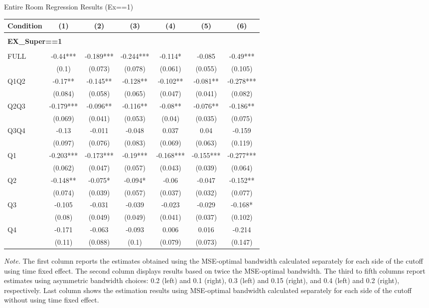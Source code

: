 \begin{table}[]
\TABLE
{Entire Room Regression Results (Ex==1) \label{result_detail1}}{\begin{tabular}{lcccccc}
\hline
Condition & (1) & (2) & (3) & (4) & (5) & (6) \\ \hline
\\ 
\multicolumn{5}{l}{\textbf{EX\_Super==1}} \\ 
\\ 
FULL & -0.44*** & -0.189*** & -0.244*** & -0.114* & -0.085 & -0.49*** \\ 
&(0.1)&(0.073) & (0.078)&(0.061)&(0.055)&(0.105)\\ 
Q1Q2 & -0.17** & -0.145** & -0.128** & -0.102** & -0.081** & -0.278*** \\ 
&(0.084)&(0.058) & (0.065)&(0.047)&(0.041)&(0.082)\\ 
Q2Q3 & -0.179*** & -0.096** & -0.116** & -0.08** & -0.076** & -0.186** \\ 
&(0.069)&(0.041) & (0.053)&(0.04)&(0.035)&(0.075)\\ 
Q3Q4 & -0.13 & -0.011 & -0.048 & 0.037 & 0.04 & -0.159 \\ 
&(0.097)&(0.076) & (0.083)&(0.069)&(0.063)&(0.119)\\ 
Q1 & -0.203*** & -0.173*** & -0.19*** & -0.168*** & -0.155*** & -0.277*** \\ 
&(0.062)&(0.047) & (0.057)&(0.043)&(0.039)&(0.064)\\ 
Q2 & -0.148** & -0.075* & -0.094* & -0.06 & -0.047 & -0.152** \\ 
&(0.074)&(0.039) & (0.057)&(0.037)&(0.032)&(0.077)\\ 
Q3 & -0.105 & -0.031 & -0.039 & -0.023 & -0.029 & -0.168* \\ 
&(0.08)&(0.049) & (0.049)&(0.041)&(0.037)&(0.102)\\ 
Q4 & -0.171 & -0.063 & -0.093 & 0.006 & 0.016 & -0.214 \\ 
&(0.11)&(0.088) & (0.1)&(0.079)&(0.073)&(0.147)\\ 
\hline 
\end{tabular}}{\textit{Note.} The first column reports the estimates obtained using the MSE-optimal bandwidth calculated separately for each side of the cutoff using time fixed effect. The second column displays results based on twice the MSE-optimal bandwidth. The third to fifth columns report estimates using asymmetric bandwidth choices: 0.2 (left) and 0.1 (right), 0.3 (left) and 0.15 (right), and 0.4 (left) and 0.2 (right), respectively. Last column shows the estimation results using MSE-optimal bandwidth calculated separately for each side of the cutoff without using time fixed effect.}
\end{table}

